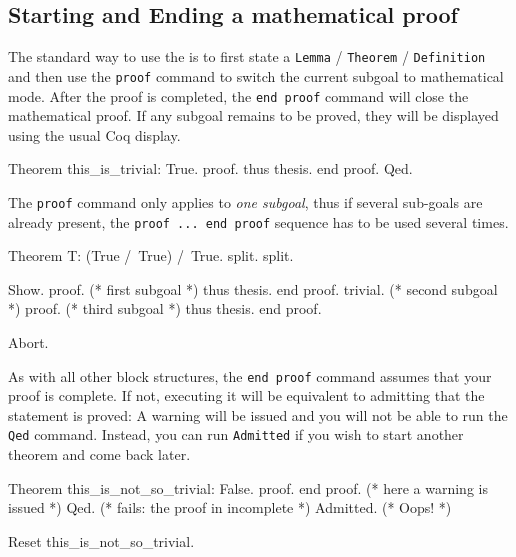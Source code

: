\subsection{Starting and Ending a mathematical proof}

The standard way to use the \DPL{} is to first state a \texttt{Lemma} /
\texttt{Theorem} / \texttt{Definition} and then use the \texttt{proof}
command to switch the current subgoal to mathematical mode.  After the
proof is completed, the \texttt{end proof} command will close the
mathematical proof. If any subgoal remains to be proved, they will be
displayed using the usual Coq display.

\begin{coq_example}
Theorem this_is_trivial: True.
proof.
  thus thesis.
end proof.
Qed.
\end{coq_example}

The {\texttt{proof}} command only applies to \emph{one subgoal}, thus
if several sub-goals are already present, the {\texttt{proof ... end
    proof}} sequence has to be used several times.

\begin{coq_example*}
Theorem T: (True /\ True) /\ True.
  split. split.
\end{coq_example*}
\begin{coq_example}
  Show.
  proof. (* first subgoal *)
    thus thesis.
  end proof.
  trivial. (* second subgoal *)
  proof. (* third subgoal *)
    thus thesis.
  end proof.
\end{coq_example}
\begin{coq_eval}
Abort.
\end{coq_eval}

As with all other block structures, the {\texttt{end proof}} command
assumes that your proof is complete. If not, executing it will be
equivalent to admitting that the statement is proved: A warning will
be issued and you will not be able to run the {\texttt{Qed}}
command. Instead, you can run {\texttt{Admitted}} if you wish to start
another theorem and come back
later.

\begin{coq_example}
Theorem this_is_not_so_trivial: False.
proof.
end proof. (* here a warning is issued *)
Qed. (* fails: the proof in incomplete *)
Admitted. (* Oops! *)
\end{coq_example}
\begin{coq_eval}
Reset this_is_not_so_trivial.   
\end{coq_eval}

